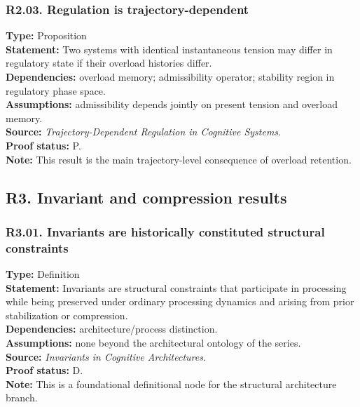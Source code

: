 \documentclass[12pt]{article}
\begin{document}
	\subsubsection*{R2.03. Regulation is trajectory-dependent}
	\textbf{Type:} Proposition \\
	\textbf{Statement:} Two systems with identical instantaneous tension may differ in regulatory
	state if their overload histories differ. \\
	\textbf{Dependencies:} overload memory; admissibility operator; stability region in regulatory
	phase space. \\
	\textbf{Assumptions:} admissibility depends jointly on present tension and overload memory. \\
	\textbf{Source:} \emph{Trajectory-Dependent Regulation in Cognitive Systems}. \\
	\textbf{Proof status:} P. \\
	\textbf{Note:} This result is the main trajectory-level consequence of overload retention.
	
	\subsection{R3. Invariant and compression results}
	
	\subsubsection*{R3.01. Invariants are historically constituted structural constraints}
	\textbf{Type:} Definition \\
	\textbf{Statement:} Invariants are structural constraints that participate in processing while
	being preserved under ordinary processing dynamics and arising from prior stabilization or
	compression. \\
	\textbf{Dependencies:} architecture/process distinction. \\
	\textbf{Assumptions:} none beyond the architectural ontology of the series. \\
	\textbf{Source:} \emph{Invariants in Cognitive Architectures}. \\
	\textbf{Proof status:} D. \\
	\textbf{Note:} This is a foundational definitional node for the structural architecture branch.
	
\end{document}
